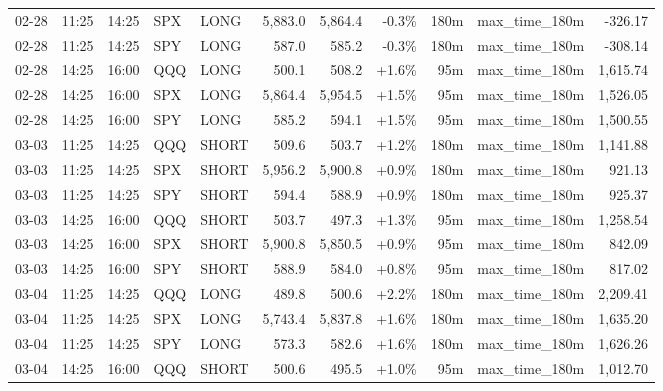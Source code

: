 \documentclass[11pt,a4paper,twoside]{article}
\begin{document}
\begin{center}
\begin{longtable}{>{\color{txtmain}}l l l l l r r r r >{\color{txtmain}}l r}
02-28 & 11:25 & 14:25 & SPX & LONG & 5,883.0 & 5,864.4 & \textcolor{lossred}{-0.3\%} & 180m & max\_time\_180m & \textcolor{lossred}{-326.17} \\
02-28 & 11:25 & 14:25 & SPY & LONG & 587.0 & 585.2 & \textcolor{lossred}{-0.3\%} & 180m & max\_time\_180m & \textcolor{lossred}{-308.14} \\
02-28 & 14:25 & 16:00 & QQQ & LONG & 500.1 & 508.2 & \textcolor{wingreen}{+1.6\%} & 95m & max\_time\_180m & \textcolor{wingreen}{1,615.74} \\
02-28 & 14:25 & 16:00 & SPX & LONG & 5,864.4 & 5,954.5 & \textcolor{wingreen}{+1.5\%} & 95m & max\_time\_180m & \textcolor{wingreen}{1,526.05} \\
02-28 & 14:25 & 16:00 & SPY & LONG & 585.2 & 594.1 & \textcolor{wingreen}{+1.5\%} & 95m & max\_time\_180m & \textcolor{wingreen}{1,500.55} \\
03-03 & 11:25 & 14:25 & QQQ & SHORT & 509.6 & 503.7 & \textcolor{wingreen}{+1.2\%} & 180m & max\_time\_180m & \textcolor{wingreen}{1,141.88} \\
03-03 & 11:25 & 14:25 & SPX & SHORT & 5,956.2 & 5,900.8 & \textcolor{wingreen}{+0.9\%} & 180m & max\_time\_180m & \textcolor{wingreen}{921.13} \\
03-03 & 11:25 & 14:25 & SPY & SHORT & 594.4 & 588.9 & \textcolor{wingreen}{+0.9\%} & 180m & max\_time\_180m & \textcolor{wingreen}{925.37} \\
03-03 & 14:25 & 16:00 & QQQ & SHORT & 503.7 & 497.3 & \textcolor{wingreen}{+1.3\%} & 95m & max\_time\_180m & \textcolor{wingreen}{1,258.54} \\
03-03 & 14:25 & 16:00 & SPX & SHORT & 5,900.8 & 5,850.5 & \textcolor{wingreen}{+0.9\%} & 95m & max\_time\_180m & \textcolor{wingreen}{842.09} \\
03-03 & 14:25 & 16:00 & SPY & SHORT & 588.9 & 584.0 & \textcolor{wingreen}{+0.8\%} & 95m & max\_time\_180m & \textcolor{wingreen}{817.02} \\
03-04 & 11:25 & 14:25 & QQQ & LONG & 489.8 & 500.6 & \textcolor{wingreen}{+2.2\%} & 180m & max\_time\_180m & \textcolor{wingreen}{2,209.41} \\
03-04 & 11:25 & 14:25 & SPX & LONG & 5,743.4 & 5,837.8 & \textcolor{wingreen}{+1.6\%} & 180m & max\_time\_180m & \textcolor{wingreen}{1,635.20} \\
03-04 & 11:25 & 14:25 & SPY & LONG & 573.3 & 582.6 & \textcolor{wingreen}{+1.6\%} & 180m & max\_time\_180m & \textcolor{wingreen}{1,626.26} \\
03-04 & 14:25 & 16:00 & QQQ & SHORT & 500.6 & 495.5 & \textcolor{wingreen}{+1.0\%} & 95m & max\_time\_180m & \textcolor{wingreen}{1,012.70} \\

\end{longtable}
\end{center}
\end{document}
